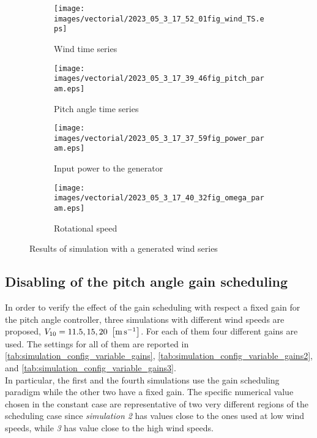 \begin{figure}[htb]
  \begin{subfigure}{0.5\columnwidth}
    \centering
    \texttt{[image: images/vectorial/2023\_05\_3\_17\_52\_01fig\_wind\_TS.eps]}
    \caption{Wind time series}
    \label{fig:2023_05_1_00_55_48fig_wind_TS.eps}
  \end{subfigure}
  \begin{subfigure}{0.5\columnwidth}
    \centering
    \texttt{[image: images/vectorial/2023\_05\_3\_17\_39\_46fig\_pitch\_param.eps]}
    \caption{Pitch angle time series}
    \label{fig:2023_05_1_00_50_19fig_power_param}
  \end{subfigure}
  \begin{subfigure}{0.5\columnwidth}
    \centering
    \texttt{[image: images/vectorial/2023\_05\_3\_17\_37\_59fig\_power\_param.eps]}
    \caption{Input power to the generator}
    \label{fig:2023_05_1_00_51_17fig_omega_param}
  \end{subfigure}
  \begin{subfigure}{0.5\columnwidth}
    \centering
    \texttt{[image: images/vectorial/2023\_05\_3\_17\_40\_32fig\_omega\_param.eps]}
    \caption{Rotational speed}
    \label{fig:2023_05_1_00_50_58fig_pitch_param}
  \end{subfigure}
  \caption{Results of simulation with a generated wind series}
  \label{fig:simulation_rand_wind_NPC}
\end{figure}

\subsection{Disabling of the pitch angle gain scheduling}\label{subsec:gain_scheduling_disabling}
In order to verify the effect of the gain scheduling with respect a fixed gain for the pitch angle controller, three simulations with different wind speeds are proposed, $V_{10} = 11.5, 15, 20 \ \left[\si{\meter\per\second}\right]$. For each of them four different gains are used. The settings for all of them are reported in \autoref{tab:simulation_config_variable_gains}, \autoref{tab:simulation_config_variable_gains2}, and \autoref{tab:simulation_config_variable_gains3}. \\
In particular, the first and the fourth simulations use the gain scheduling paradigm while the other two have a fixed gain. The specific numerical value chosen in the constant case are representative of two very different regions of the scheduling case since \textit{simulation 2} has values close to the ones used at low wind speeds, while \textit{3} has value close to the high wind speeds. 

